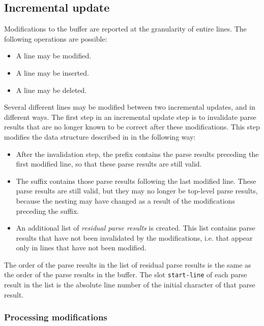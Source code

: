 \subsection{Incremental update}

Modifications to the buffer are reported at the granularity of entire
lines.  The following operations are possible:

\begin{itemize}
\item A line may be modified.
\item A line may be inserted.
\item A line may be deleted.
\end{itemize}

Several different lines may be modified between two incremental
updates, and in different ways.  The first step in an incremental
update step is to invalidate parse results that are no longer known to
be correct after these modifications.  This step modifies the data
structure described in
 in the following
way:

\begin{itemize}
\item After the invalidation step, the prefix contains the parse
  results preceding the first modified line, so that these parse
  results are still valid.
\item The suffix contains those parse results following the last
  modified line.  These parse results are still valid, but they may no
  longer be top-level parse results, because the nesting may have
  changed as a result of the modifications preceding the suffix.
\item An additional list of \emph{residual parse results} is created.
  This list contains parse results that have not been invalidated by
  the modifications, i.e. that appear only in lines that have not been
  modified.
\end{itemize}

The order of the parse results in the list of residual parse results
is the same as the order of the parse results in the buffer.  The slot
\texttt{start-line} of each parse result in the list is the absolute
line number of the initial character of that parse result.

\subsubsection{Processing modifications}


